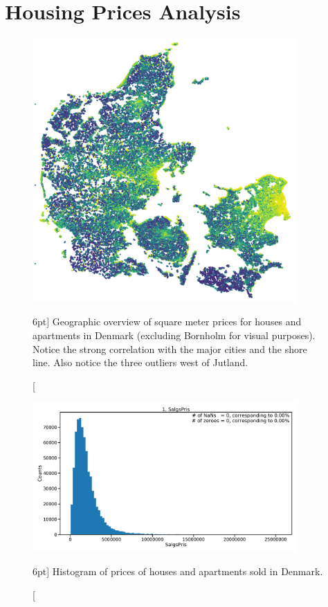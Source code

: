 \documentclass[a4paper, twoside]{tufte-book}
\begin{document}
\chapter{Housing Prices Analysis}
\label{ch:housing_price_analysis}

\begin{figure}
  \includegraphics[width=0.9\textwidth, trim=0 0 0 0, clip]{figures/housing/Denmark_Overview_SqmPrice.png}
  \caption[Geographic overview of square meter price in Denmark][6pt]
          {Geographic overview of square meter prices for houses and apartments in Denmark (excluding Bornholm for visual purposes). Notice the strong correlation with the major cities and the shore line. Also notice the three outliers west of Jutland. }
  \label{fig:h:geo_overview}
\end{figure}



\begin{figure}
  \includegraphics[width=0.9\textwidth, page=2]{figures/housing/overview_fig.pdf}
  \caption[Histogram of prices of houses and apartments sold in Denmark][6pt]
          {Histogram of prices of houses and apartments sold in Denmark.}
  \label{fig:h:price_overview}
\end{figure}
\end{document}
